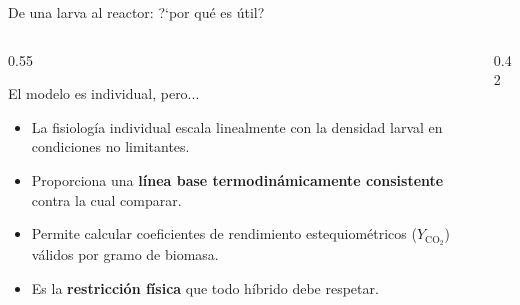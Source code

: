 \documentclass[aspectratio=169, 11pt]{beamer}
\begin{document}
\begin{frame}{De una larva al reactor: ?`por qu\'{e} es \'{u}til?}
    \begin{columns}[T]
        \begin{column}{0.55\textwidth}
            \begin{alertblock}{El modelo es individual, pero...}
                \begin{itemize}
                    \item La fisiolog\'{i}a individual escala linealmente con la densidad larval en condiciones no limitantes.
                    \item Proporciona una \textbf{l\'{i}nea base termodin\'{a}micamente consistente} contra la cual comparar.
                    \item Permite calcular coeficientes de rendimiento estequiom\'{e}tricos ($Y_{\text{CO}_2}$) v\'{a}lidos por gramo de biomasa.
                    \item Es la \textbf{restricci\'{o}n f\'{i}sica} que todo h\'{i}brido debe respetar.
                \end{itemize}
            \end{alertblock}
        \end{column}
        \begin{column}{0.42\textwidth}
            \begin{center}
            \end{center}
        \end{column}
    \end{columns}
\end{frame}
\end{document}
